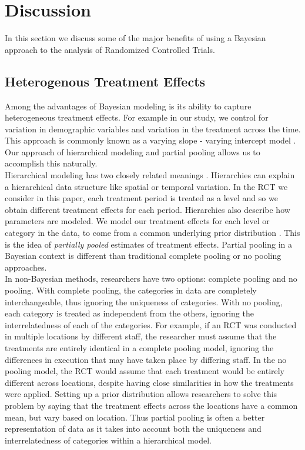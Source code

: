 \documentclass{article}
\begin{document}
%
%

\section{Discussion}
In this section we discuss some of the major benefits of using a Bayesian approach to the analysis of Randomized Controlled Trials.

\subsection{Heterogenous Treatment Effects}
Among the advantages of Bayesian modeling is its ability to capture heterogeneous treatment effects. For example in our study, we control for variation in demographic variables and variation in the treatment across the time. This approach is commonly known as a varying slope - varying intercept model \cite{gelman2006data}. Our approach of hierarchical modeling and partial pooling \cite{gelman2014bayesian} allows us to accomplish this naturally. \\
Hierarchical modeling has two closely related meanings \cite{feller2015hierarchical}. Hierarchies can explain a hierarchical data structure like spatial or temporal variation. In the RCT we consider in this paper, each treatment period is treated as a level and so we obtain different treatment effects for each period. Hierarchies also describe how parameters are modeled. We model our treatment effects for each level or category in the data, to come from a common underlying prior distribution \cite{gelman2014bayesian}. This is the idea of \textit{partially pooled} estimates of treatment effects. Partial pooling in a Bayesian context is different than traditional complete pooling or no pooling approaches. \\
In non-Bayesian methods, researchers have two options: complete pooling and no pooling. With complete pooling, the categories in data are completely interchangeable, thus ignoring the uniqueness of categories. With no pooling, each category is treated as independent from the others, ignoring the interrelatedness of each of the categories.  For example, if an RCT was conducted in multiple locations by different staff, the researcher must assume that the treatments are entirely identical in a complete pooling model, ignoring the differences in execution that may have taken place by differing staff. In the no pooling model, the RCT would assume that each treatment would be entirely different across locations, despite having close similarities in how the treatments were applied. Setting up a prior distribution allows researchers to solve this problem by saying that the treatment effects across the locations have a common mean, but vary based on location. Thus partial pooling is often a better representation of data as it takes into account both the uniqueness and interrelatedness of categories within a hierarchical model.
\end{document}
